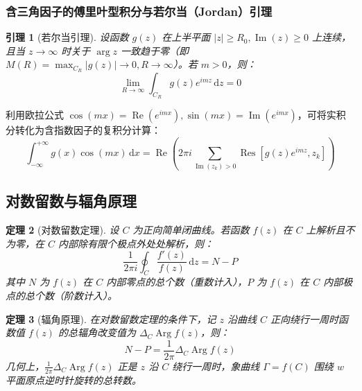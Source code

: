 \documentclass[11pt,a4paper,fontset=fandol]{ctexart}
\newtheorem{theorem}{定理}[section]
\newtheorem{lemma}[theorem]{引理}
\theoremstyle{remark}
\begin{document}
\subsubsection{含三角因子的傅里叶型积分与若尔当（Jordan）引理}
\begin{lemma}[若尔当引理]
设函数 $g(z)$ 在上半平面 $|z| \ge R_0, \operatorname{Im}(z) \ge 0$ 上连续，且当 $z \to \infty$ 时关于 $\arg z$ 一致趋于零（即 $M(R) = \max_{C_R} |g(z)| \to 0, R \to \infty$）。若 $m > 0$，则：
\begin{equation}
    \lim_{R \to \infty} \int_{C_R} g(z) e^{imz}\,\mathrm{d}z = 0
\end{equation}
\end{lemma}

利用欧拉公式 $\cos(mx) = \operatorname{Re}(e^{imx}), \sin(mx) = \operatorname{Im}(e^{imx})$，可将实积分转化为含指数因子的复积分计算：
\begin{equation}
    \int_{-\infty}^{+\infty} g(x)\cos(mx)\,\mathrm{d}x = \operatorname{Re}\left( 2\pi i \sum_{\operatorname{Im}(z_k) > 0} \operatorname{Res}[g(z)e^{imz}, z_k] \right)
\end{equation}

\subsection{对数留数与辐角原理}

\begin{theorem}[对数留数定理]
设 $C$ 为正向简单闭曲线。若函数 $f(z)$ 在 $C$ 上解析且不为零，在 $C$ 内部除有限个极点外处处解析，则：
\begin{equation}
    \frac{1}{2\pi i} \oint_C \frac{f'(z)}{f(z)}\,\mathrm{d}z = N - P
\end{equation}
其中 $N$ 为 $f(z)$ 在 $C$ 内部零点的总个数（重数计入），$P$ 为 $f(z)$ 在 $C$ 内部极点的总个数（阶数计入）。
\end{theorem}

\begin{theorem}[辐角原理]
在对数留数定理的条件下，记 $z$ 沿曲线 $C$ 正向绕行一周时函数值 $f(z)$ 的总辐角改变值为 $\Delta_C \operatorname{Arg} f(z)$，则：
\begin{equation}
    N - P = \frac{1}{2\pi} \Delta_C \operatorname{Arg} f(z)
\end{equation}
几何上，$\frac{1}{2\pi}\Delta_C \operatorname{Arg} f(z)$ 正是 $z$ 沿 $C$ 绕行一周时，象曲线 $\Gamma = f(C)$ 围绕 $w$ 平面原点逆时针旋转的总转数。
\end{theorem}
\end{document}

